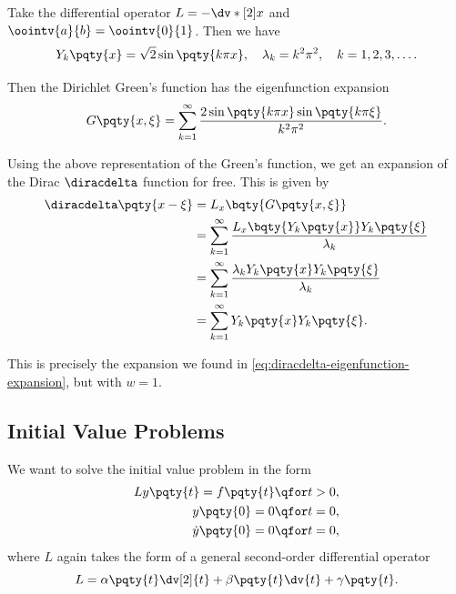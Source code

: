 \begin{example}
    Take the differential operator \(L = -\dv*[2]{x}\) and \(\oointv{a}{b} = \oointv{0}{1}\). Then we have
    \begin{equation}
        Y_k\pqty{x} = \sqrt{2} \sin\pqty{k \pi x}, \quad \lambda_k = k^2 \pi^2, \quad k = 1, 2, 3, \ldots.
    \end{equation}

    Then the Dirichlet Green's function has the eigenfunction expansion
    \begin{equation}
        G\pqty{x, \xi} = \sum_{k = 1}^{\infty} \frac{2 \sin\pqty{k \pi x} \sin\pqty{k \pi \xi}}{k^2 \pi^2}.
    \end{equation}

    Using the above representation of the Green's function, we get an expansion of the Dirac \(\diracdelta\) function for free. This is given by
    \begin{subequations}
        \begin{align}
            \diracdelta\pqty{x - \xi} &= L_x \bqty{G\pqty{x, \xi}} \\
            &= \sum_{k = 1}^{\infty} \frac{L_x \bqty{Y_k\pqty{x}} Y_k\pqty{\xi}}{\lambda_k} \\
            &= \sum_{k = 1}^{\infty} \frac{\lambda_k Y_k\pqty{x} Y_k\pqty{\xi}}{\lambda_k} \\
            &= \sum_{k = 1}^{\infty} Y_k\pqty{x} Y_k\pqty{\xi}.
        \end{align}
    \end{subequations}

    This is precisely the expansion we found in \eqref{eq:diracdelta-eigenfunction-expansion}, but with \(w = 1\).
\end{example}

\subsection{Initial Value Problems}

We want to solve the initial value problem in the form
\begin{subequations}
    \begin{align}
        Ly\pqty{t} = f\pqty{t} & \qfor t > 0, \\
        y\pqty{0} = 0 & \qfor t = 0, \\
        \dot{y}\pqty{0} = 0 & \qfor t = 0,
    \end{align}
\end{subequations}
where \(L\) again takes the form of a general second-order differential operator
\begin{equation}
    L = \alpha\pqty{t} \dv[2]{t} + \beta\pqty{t} \dv{t} + \gamma\pqty{t}.
\end{equation}

